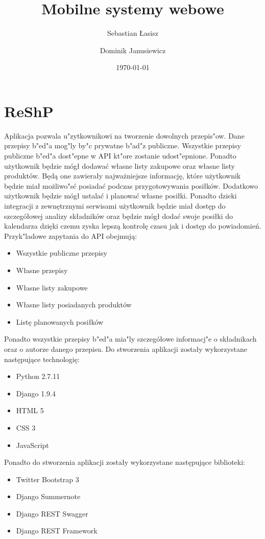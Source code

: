 \documentclass{article}
\title{Mobilne systemy webowe}
\author{
	Sebastian Łasisz
	\and
	Dominik Janusiewicz}
\date{\today}
\begin{document}
\maketitle

\section{ReShP}
	Aplikacja pozwala u"zytkownikowi na tworzenie dowolnych przepis"ow. Dane przepisy b"ed"a mog"ly by"c prywatne b"ad"z publiczne. Wszystkie przepisy publiczne b"ed"a dost"epne w API kt"ore zostanie udost"epnione. Ponadto użytkownik będzie mógł dodawać własne listy zakupowe oraz własne listy produktów. Będą one zawierały najważniejsze informację, które użytkownik będzie miał możliwo"sć posiadać podczas przygotowywania posiłków. Dodatkowo użytkownik będzie mógł ustalać i planować własne posiłki. Ponadto dzieki integracji z zewnętrznymi serwisami użytkownik będzie miał dostęp do szczegółowej analizy składników oraz będzie mógł dodać swoje posiłki do kalendarza dzięki czemu zyska lepszą kontrolę czasu jak i dostęp do powiadomień. Przyk"ladowe zapytania do API obejmują:
	\begin{itemize}
		\item Wszystkie publiczne  przepisy
		\item Własne przepisy
		\item Własne listy zakupowe
		\item Własne listy posiadanych produktów
		\item Listę planowanych posiłków
	\end{itemize}
Ponadto wszystkie przepisy b"ed"a mia"ly szczegółowe informacj"e o składnikach oraz o autorze danego przepisu.
Do stworzenia aplikacji zostały wykorzystane następujące technologię:
\begin{itemize}
\item Python 2.7.11
\item Django 1.9.4
\item HTML 5
\item CSS 3
\item JavaScript
\end{itemize}
Ponadto do stworzenia aplikacji zostały wykorzystane następujące biblioteki:
\begin{itemize}
\item Twitter Bootstrap 3
\item Django Summernote
\item Django REST Swagger
\item Django REST Framework
\end{itemize}
\end{document}

